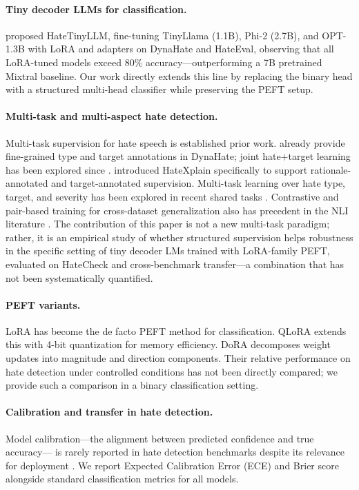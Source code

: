 \documentclass{article}
\begin{document}
\paragraph{Tiny decoder LLMs for classification.}
\citet{sen2024hatetinyllm} proposed HateTinyLLM, fine-tuning TinyLlama (1.1B),
Phi-2 (2.7B), and OPT-1.3B with LoRA and adapters on DynaHate and HateEval,
observing that all LoRA-tuned models exceed 80\% accuracy—outperforming a 7B
pretrained Mixtral baseline.
Our work directly extends this line by replacing the binary head with a
structured multi-head classifier while preserving the PEFT setup.

\paragraph{Multi-task and multi-aspect hate detection.}
Multi-task supervision for hate speech is established prior work.
\citet{vidgen2021dynahate} already provide fine-grained type and target annotations
in DynaHate; joint hate+target learning has been explored since \citep{basile2019semeval}.
\citet{mathew2021hatexplain} introduced HateXplain specifically to support
rationale-annotated and target-annotated supervision.
Multi-task learning over hate type, target, and severity has been explored in
recent shared tasks \citep{prama2025hatesense}.
Contrastive and pair-based training for cross-dataset generalization also has
precedent in the NLI literature \citep{gardner2020contrast}.
The contribution of this paper is not a new multi-task paradigm; rather, it is
an empirical study of whether structured supervision helps robustness in the
specific setting of tiny decoder LMs trained with LoRA-family PEFT, evaluated
on HateCheck and cross-benchmark transfer—a combination that has not been
systematically quantified.

\paragraph{PEFT variants.}
LoRA \citep{hu2022lora} has become the de facto PEFT method for classification.
QLoRA \citep{dettmers2023qlora} extends this with 4-bit quantization for memory
efficiency.
DoRA \citep{liu2024dora} decomposes weight updates into magnitude and direction
components.
Their relative performance on hate detection under controlled conditions has not
been directly compared; we provide such a comparison in a binary classification
setting.

\paragraph{Calibration and transfer in hate detection.}
Model calibration—the alignment between predicted confidence and true accuracy—
is rarely reported in hate detection benchmarks despite its relevance for
deployment \citep{guo2017calibration}.
We report Expected Calibration Error (ECE) and Brier score alongside
standard classification metrics for all models.
\end{document}
